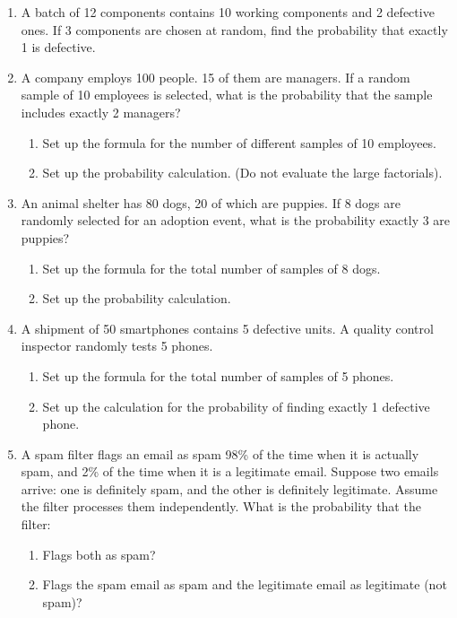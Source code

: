 \documentclass[11pt]{article}
\begin{document}
\begin{enumerate}
\item A batch of 12 components contains 10 working components and 2 defective ones. If 3 components are chosen at random, find the probability that exactly 1 is defective.

\item A company employs 100 people. 15 of them are managers. If a random sample of 10 employees is selected, what is the probability that the sample includes exactly 2 managers?
\begin{enumerate}
    \item Set up the formula for the number of different samples of 10 employees.
    \item Set up the probability calculation. (Do not evaluate the large factorials).
\end{enumerate}

\item An animal shelter has 80 dogs, 20 of which are puppies. If 8 dogs are randomly selected for an adoption event, what is the probability exactly 3 are puppies?
\begin{enumerate}
    \item Set up the formula for the total number of samples of 8 dogs.
    \item Set up the probability calculation.
\end{enumerate}

\item A shipment of 50 smartphones contains 5 defective units. A quality control inspector randomly tests 5 phones.
\begin{enumerate}
    \item Set up the formula for the total number of samples of 5 phones.
    \item Set up the calculation for the probability of finding exactly 1 defective phone.
\end{enumerate}

\item A spam filter flags an email as spam 98\% of the time when it is actually spam, and 2\% of the time when it is a legitimate email. Suppose two emails arrive: one is definitely spam, and the other is definitely legitimate. Assume the filter processes them independently. What is the probability that the filter:
\begin{enumerate}
    \item Flags both as spam?
    \item Flags the spam email as spam and the legitimate email as legitimate (not spam)?
\end{enumerate}


\end{enumerate}
\end{document}
